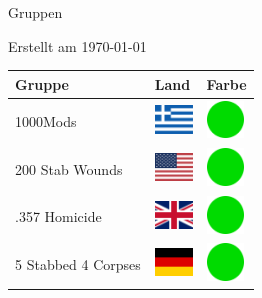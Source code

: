 \documentclass[12pt, a4paper, twoside]{report}
\begin{document}
	
	\begin{center}
		\vspace{1cm}
		{\Large Gruppen\par}
		
		{\large Erstellt am \today\par}
	\end{center}
	
	\begin{center}
		\begin{longtable}{|p{5cm}|p{2cm}|p{2cm}|} 
			
			\hline
			\rowcolor{lightgray} Gruppe & Land & Farbe \\ \hline
			\endhead
 1000Mods                                                   & \includegraphics[width=1cm]{../img/flags/gr} &   \includegraphics[width=1cm]{../likes/y} \\ \hline
 200 Stab Wounds                                            & \includegraphics[width=1cm]{../img/flags/us} &   \includegraphics[width=1cm]{../likes/y} \\ \hline
 .357 Homicide                                              & \includegraphics[width=1cm]{../img/flags/gb} &   \includegraphics[width=1cm]{../likes/y} \\ \hline
 5 Stabbed 4 Corpses                                        & \includegraphics[width=1cm]{../img/flags/de} &   \includegraphics[width=1cm]{../likes/y} \\ \hline

\end{longtable}
\end{center}
\end{document}
